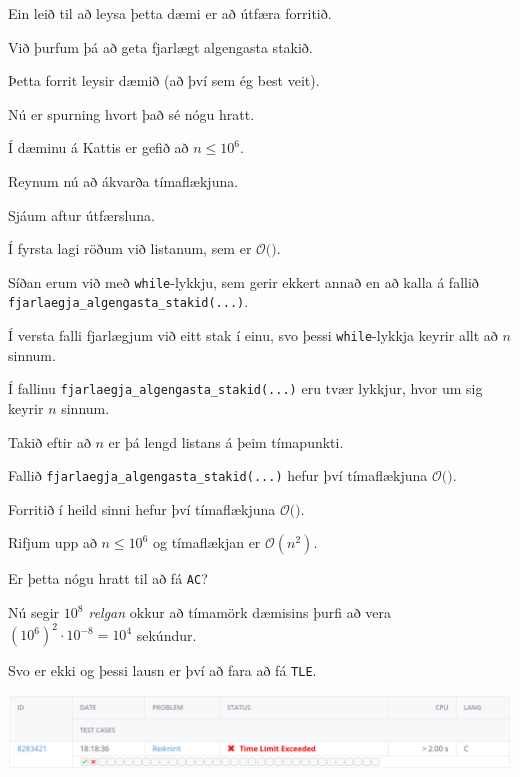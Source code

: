 {
	{
		\item<1-> Ein leið til að leysa þetta dæmi er að útfæra forritið.
		\item<2-> Við þurfum þá að geta fjarlægt algengasta stakið.
	}
}

{
}

{
	{
		\item<1-> Þetta forrit leysir dæmið (að því sem ég best veit).
		\item<2-> Nú er spurning hvort það sé nógu hratt.
		\item<3-> Í dæminu á Kattis er gefið að $n \leq 10^6$.
		\item<4-> Reynum nú að ákvarða tímaflækjuna.
		\item<5-> Sjáum aftur útfærsluna.
	}
}

{
}

{
	{
		\item<1-> Í fyrsta lagi röðum við listanum, sem er $\mathcal{O}($\onslide<2->{$n \log n$}$)$.
		\item<3-> Síðan erum við með \texttt{while}-lykkju, sem gerir ekkert annað en að kalla á fallið \texttt{fjarlaegja\_algengasta\_stakid(...)}.
		\item<4-> Í versta falli fjarlægjum við eitt stak í einu, svo þessi \texttt{while}-lykkja keyrir allt að $n$ sinnum.
		\item<5-> Í fallinu \texttt{fjarlaegja\_algengasta\_stakid(...)} eru tvær lykkjur, hvor um sig keyrir $n$ sinnum.
		\item<6-> Takið eftir að $n$ er þá lengd listans á þeim tímapunkti.
		\item<7-> Fallið \texttt{fjarlaegja\_algengasta\_stakid(...)} hefur því tímaflækjuna $\mathcal{O}($\onslide<8->{$\ n\ $}$)$.
		\item<9-> Forritið í heild sinni hefur því tímaflækjuna $\mathcal{O}($\onslide<10->{$n^2$}$)$.
	}
}

{
	{
		\item<1-> Rifjum upp að $n \leq 10^6$ og tímaflækjan er $\mathcal{O}(n^2)$.
		\item<2-> Er þetta nógu hratt til að fá \texttt{AC}?
		\item<3-> Nú segir \emph{$10^8$ relgan} okkur að tímamörk dæmisins þurfi að vera $(10^6)^2 \cdot 10^{-8} = 10^4$ sekúndur.
		\item<4-> Svo er ekki og þessi lausn er því að fara að fá \texttt{TLE}.
		\item<5->[] \includegraphics[scale = 0.25]{fig/tle}
	}
}

{
}


